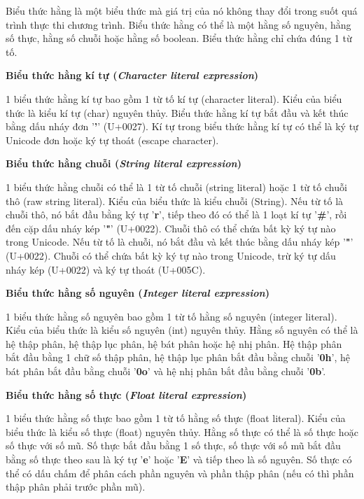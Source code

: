 \regexlitexpr

Biểu thức hằng là một biểu thức mà giá trị của nó không thay đổi trong suốt quá trình thực thi chương trình. Biểu thức hằng có thể là một hằng số nguyên, hằng số thực, hằng số chuỗi hoặc hằng số boolean. Biểu thức hằng chỉ chứa đúng 1 từ tố.

\noindent\textbf{Biểu thức hằng kí tự (\textit{Character literal expression})}

1 biểu thức hằng kí tự bao gồm 1 từ tố kí tự (character literal). Kiểu của biểu thức là kiểu kí tự (char) nguyên thủy. Biểu thức hằng kí tự bắt đầu và kết thúc bằng dấu nháy đơn '\textbf{'}' (U+0027). Kí tự trong biểu thức hằng kí tự có thể là ký tự Unicode đơn hoặc ký tự thoát (escape character). 

\noindent\textbf{Biểu thức hằng chuỗi (\textit{String literal expression})}

1 biểu thức hằng chuỗi có thể là 1 từ tố chuỗi (string literal) hoặc 1 từ tố chuỗi thô (raw string literal). Kiểu của biểu thức là kiểu chuỗi (String). Nếu từ tố là chuỗi thô, nó bắt đầu bằng ký tự '\textbf{r}', tiếp theo đó có thể là 1 loạt kí tự '\textbf{\#}', rồi đến cặp dấu nháy kép '\textbf{"}' (U+0022). Chuỗi thô có thể chứa bất kỳ ký tự nào trong Unicode. Nếu từ tố là chuỗi, nó bắt đầu và kết thúc bằng dấu nháy kép '\textbf{"}' (U+0022). Chuỗi có thể chứa bất kỳ ký tự nào trong Unicode, trừ ký tự dấu nháy kép (U+0022) và ký tự thoát (U+005C).

\noindent\textbf{Biểu thức hằng số nguyên (\textit{Integer literal expression})}

1 biểu thức hằng số nguyên bao gồm 1 từ tố hằng số nguyên (integer literal). Kiểu của biểu thức là kiểu số nguyên (int) nguyên thủy. Hằng số nguyên có thể là hệ thập phân, hệ thập lục phân, hệ bát phân hoặc hệ nhị phân. Hệ thập phân bắt đầu bằng 1 chữ số thập phân, hệ thập lục phân bắt đầu bằng chuỗi '\textbf{0h}', hệ bát phân bắt đầu bằng chuỗi '\textbf{0o}' và hệ nhị phân bắt đầu bằng chuỗi '\textbf{0b}'.

\noindent\textbf{Biểu thức hằng số thực (\textit{Float literal expression})}

1 biểu thức hằng số thực bao gồm 1 từ tố hằng số thực (float literal). Kiểu của biểu thức là kiểu số thực (float) nguyên thủy. Hằng số thực có thể là số thực hoặc số thực với số mũ. Số thực bắt đầu bằng 1 số thực, số thực với số mũ bắt đầu bằng số thực theo sau là ký tự '\textbf{e}' hoặc '\textbf{E}' và tiếp theo là số nguyên. Số thực có thể có dấu chấm để phân cách phần nguyên và phần thập phân (nếu có thì phần thập phân phải trước phần mũ). 

